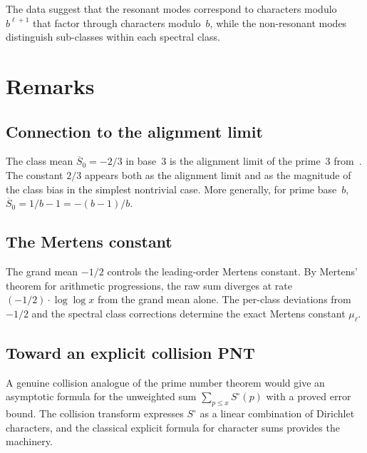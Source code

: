 \documentclass[12pt]{amsart}
\theoremstyle{definition}
\theoremstyle{remark}
\begin{document}
The data suggest that the resonant modes correspond to
characters modulo~$b^{\ell+1}$ that factor through characters
modulo~$b$, while the non-resonant modes distinguish
sub-classes within each spectral class.

\section{Remarks}

\subsection*{Connection to the alignment limit}

The class mean $\overline{S}_0 = -2/3$ in base~$3$ is the
alignment limit of the prime~$3$ from~\cite{paper1}. The
constant $2/3$ appears both as the alignment limit and as
the magnitude of the class bias in the simplest nontrivial
case. More generally, for prime base~$b$,
$\overline{S}_0 = 1/b - 1 = -(b{-}1)/b$.

\subsection*{The Mertens constant}

The grand mean $-1/2$ controls the leading-order Mertens
constant. By Mertens' theorem for arithmetic progressions,
the raw sum diverges at rate $(-1/2) \cdot \log\log x$
from the grand mean alone. The per-class deviations from
$-1/2$ and the spectral class corrections determine the
exact Mertens constant $\mu_{\ell}$.

\subsection*{Toward an explicit collision PNT}

A genuine collision analogue of the prime number theorem
would give an asymptotic formula for the unweighted sum
$\sum_{p \le x} S^{\circ}(p)$ with a proved error bound.
The collision transform expresses $S^{\circ}$ as a linear
combination of Dirichlet characters, and the classical
explicit formula for character sums provides the machinery.
\end{document}
